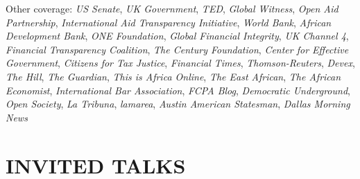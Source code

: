 \documentclass[10pt]{article}
\begin{document}
\begin{etaremune}
\item Other coverage: \textit{US Senate}, \textit{UK Government}, \textit{TED}, \textit{Global Witness}, \textit{Open Aid Partnership}, \textit{International Aid Transparency Initiative}, \textit{World Bank}, \textit{African Development Bank}, \textit{ONE Foundation}, \textit{Global Financial Integrity}, \textit{UK Channel 4}, \textit{Financial Transparency Coalition}, \textit{The Century Foundation}, \textit{Center for Effective Government}, \textit{Citizens for Tax Justice}, \textit{Financial Times}, \textit{Thomson-Reuters}, \textit{Devex}, \textit{The Hill}, \textit{The Guardian}, \textit{This is Africa Online}, \textit{The East African}, \textit{The African Economist}, \textit{International Bar Association}, \textit{FCPA Blog}, \textit{Democratic Underground}, \textit{Open Society}, \textit{La Tribuna}, \textit{lamarea}, \textit{Austin American Statesman}, \textit{Dallas Morning News}
\end{etaremune}



\section*{INVITED TALKS}
\end{document}
